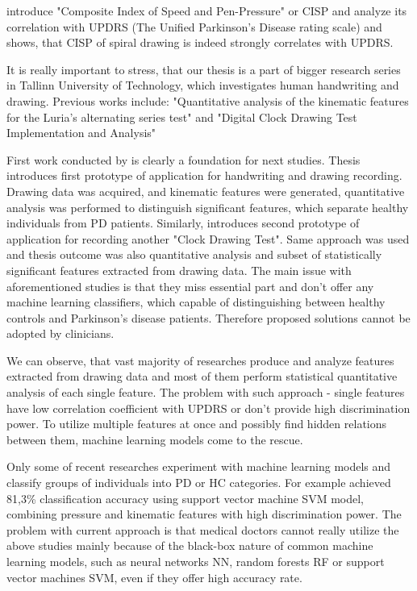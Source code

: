 \citet*{zham2017distinguishing} introduce "Composite Index of Speed and Pen-Pressure" or CISP and analyze its correlation with UPDRS (The Unified Parkinson's Disease rating scale) and shows, that CISP of spiral drawing is indeed strongly correlates with UPDRS. 

% 
% 

It is really important to stress, that our thesis is a part of bigger research series in Tallinn University of Technology, which investigates human handwriting and drawing. Previous works include: "Quantitative analysis of the kinematic features for the Luria’s alternating series test"\cite{nomm2016quantitative, kozhenkina2016luria} and "Digital Clock Drawing Test Implementation and Analysis"\cite{masarov2017clock}

First work conducted by \citet{kozhenkina2016luria} is clearly a foundation for next studies. Thesis introduces first prototype of application for handwriting and drawing recording. Drawing data was acquired, and kinematic features were generated, quantitative analysis was performed to distinguish significant features, which separate healthy individuals from PD patients. Similarly, \citet{masarov2017clock} introduces second prototype of application for recording another "Clock Drawing Test". Same approach was used and thesis outcome was also quantitative analysis and subset of statistically significant features extracted from drawing data. The main issue with aforementioned studies is that they miss essential part and don't offer any machine learning classifiers, which capable of distinguishing between healthy controls and Parkinson's disease patients. Therefore proposed solutions cannot be adopted by clinicians. 

% 
% 

We can observe, that vast majority of researches produce and analyze features extracted from drawing data and most of them perform statistical quantitative analysis of each single feature. The problem with such approach - single features have low correlation coefficient with UPDRS or don't provide high discrimination power. To utilize multiple features at once and possibly find hidden relations between them, machine learning models come to the rescue.

Only some of recent researches \cite{aghanavesi2017smartphone, pereira2016deep, nomm2016recognition} experiment with machine learning models and classify groups of individuals into PD or HC categories. For example \citet{drotar2016evaluation} achieved 81,3\% classification accuracy using support vector machine SVM model, combining pressure and kinematic features with high discrimination power. The problem with current approach is that medical doctors cannot really utilize the above studies mainly because of the black-box nature of common machine learning models, such as neural networks NN, random forests RF or support vector machines SVM, even if they offer high accuracy rate. 

